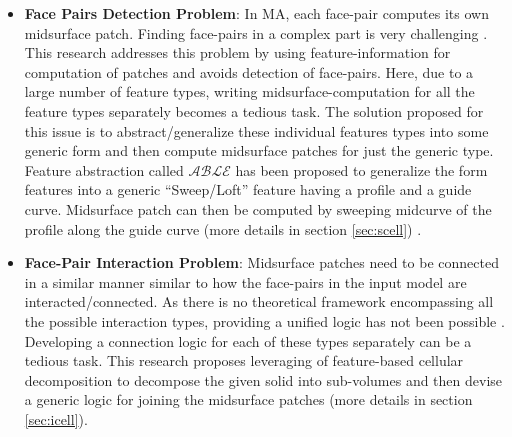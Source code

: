 \begin{itemize}[noitemsep,topsep=2pt,parsep=2pt,partopsep=2pt]%
	\item  \textbf{Face Pairs Detection Problem}:  \label{sec:facepairdetection}
In MA, each face-pair computes its own midsurface patch. Finding face-pairs in a complex part is very challenging \cite{Boussuge2013}. This research addresses this problem by using feature-information for computation of patches and avoids detection of face-pairs. Here, due to a large number of feature types, writing midsurface-computation for all the feature types separately becomes a tedious task. The solution proposed for this issue is to abstract/generalize these individual features types into some generic form and then compute midsurface patches for just the generic type. Feature abstraction called $\mathcal{ABLE}$ has been proposed to generalize the form features into a generic ``Sweep/Loft'' feature having a profile and a guide curve. Midsurface patch can then be computed by sweeping midcurve of the profile along the guide curve (more details in section \ref{sec:scell}) \cite{YogeshIITG2014}.

	\item  \textbf{Face-Pair Interaction Problem}: \label{sec:facepairinteraction}
Midsurface patches need to be connected in a similar manner similar to how the face-pairs in the input model are interacted/connected. As there is no theoretical framework encompassing all the possible interaction types, providing a unified logic has not been possible \cite{Stolt2006}.   Developing a connection logic for each of these types separately can be a tedious task. This research proposes  leveraging of feature-based cellular decomposition to decompose the given solid into sub-volumes and then devise a generic logic for joining the midsurface patches (more details in section \ref{sec:icell}).
\end{itemize}
 